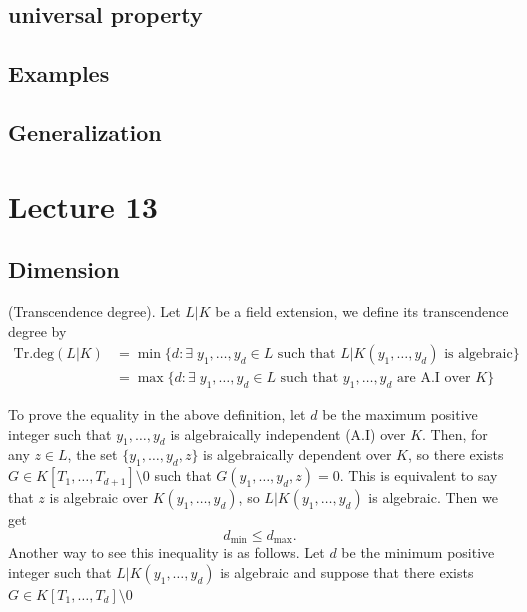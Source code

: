 \subsection{universal property}

\subsection{Examples}
\subsection{Generalization}

\section{Lecture 13}
\subsection{Dimension}
\begin{dang}
\begin{definition}\label{definition: transcendence degree}
    (Transcendence degree). Let $L|K$ be a field extension, we define its transcendence degree by 
    \begin{equation}
        \begin{split}
    \text{Tr.deg}(L|K)&=\min\{d:\exists\; y_1,\dots,y_d\in L\text{ such that } L|K(y_1,\dots,y_d)\text{ is algebraic}\}\\
    &=\max\{d:\exists\; y_1,\dots,y_d\in L\text{ such that } y_1,\dots,y_d\text{ are A.I over }K\}
        \end{split}
    \end{equation}
\end{definition}
\end{dang}
To prove the equality in the above definition, let $d$ be the maximum positive integer such that 
$y_1,\dots, y_d$ is algebraically independent (A.I) over $K$. Then, for any $z\in L$, the set 
$\{y_1,\dots,y_d,z\}$ is algebraically dependent over $K$, so there exists $G\in K[T_1,\dots, T_{d+1}]\setminus0$ such that 
$G(y_1,\dots, y_d,z)=0$. This is equivalent to say that $z$ is algebraic over $K(y_1,\dots,y_d)$, so 
$L|K(y_1,\dots, y_d)$ is algebraic. Then we get
\begin{equation}
    d_{\min}\leq d_{\max}.
\end{equation}
Another way to see this inequality is as follows. Let $d$ be the minimum positive integer such that 
$L|K(y_1,\dots, y_d)$ is algebraic and suppose that there exists $G\in K[T_1,\dots, T_d]\setminus0$ 
